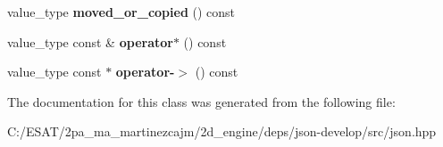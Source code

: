 \begin{DoxyCompactItemize}
value\+\_\+type {\bfseries moved\+\_\+or\+\_\+copied} () const
\item 
\mbox{\label{classnlohmann_1_1detail_1_1json__ref_aa3100e41472dba02ab78ccc1607e44ab}} 
value\+\_\+type const  \& {\bfseries operator$\ast$} () const
\item 
\mbox{\label{classnlohmann_1_1detail_1_1json__ref_adb652774a67829876449dc0b30637456}} 
value\+\_\+type const  $\ast$ {\bfseries operator-\/$>$} () const
\end{DoxyCompactItemize}


The documentation for this class was generated from the following file\+:\begin{DoxyCompactItemize}
\item 
C\+:/\+E\+S\+A\+T/2pa\+\_\+ma\+\_\+martinezcajm/2d\+\_\+engine/deps/json-\/develop/src/json.\+hpp\end{DoxyCompactItemize}
